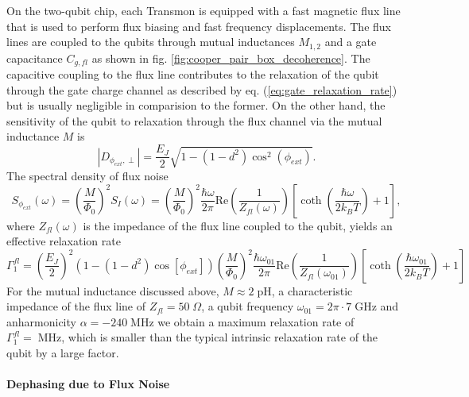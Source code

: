 On the two-qubit chip, each Transmon is equipped with a fast magnetic flux line that is used to perform flux biasing and fast frequency displacements. The flux lines are coupled to the qubits through mutual inductances $M_{1,2}$ and a gate capacitance $C_{g,fl}$ as shown in fig. \ref{fig:cooper_pair_box_decoherence}. The capacitive coupling to the flux line contributes to the relaxation of the qubit through the gate charge channel as described by eq. (\ref{eq:gate_relaxation_rate}) but is usually negligible in comparision to the former. On the other hand, the sensitivity of the qubit to relaxation through the flux channel via the mutual inductance $M$ is
%
\begin{equation}
\left|D_{\phi_{ext},\perp}\right|  = \frac{E_J}{2}\sqrt{1-(1-d^2)\cos^2{\left(\phi_{ext}\right)}}.
\end{equation}
%
The spectral density of flux noise
%
\begin{equation}
S_{\phi_{ext}}(\omega) = \left(\frac{M}{\Phi_0}\right)^2 S_I(\omega) = \left(\frac{M}{\Phi_0}\right)^2\frac{\hbar\omega}{2\pi}\mathrm{Re}\left(\frac{1}{Z_{fl}(\omega)}\right)\left[\coth{\left(\frac{\hbar\omega}{2k_B T}\right)}+1\right],
\end{equation}
%
where $Z_{fl}(\omega)$ is the impedance of the flux line coupled to the qubit, yields an effective relaxation rate
%
\begin{equation}
\Gamma_1^{fl}= \left(\frac{E_J}{2}\right)^2\left(1-(1-d^2)\cos{\left[\phi_{ext}\right]}\right)\left(\frac{M}{\Phi_0}\right)^2\frac{\hbar \omega_{01}}{2\pi}\mathrm{Re}\left(\frac{1}{Z_{fl}(\omega_{01})}\right)\left[\coth{\left(\frac{\hbar\omega_{01}}{2 k_B T}\right)}+1\right]
\end{equation}
%
For the mutual inductance discussed above, $M\approx 2\;\mathrm{pH}$, a characteristic impedance of the flux line of $Z_{fl}=50\;\Omega$, a qubit frequency $\omega_{01}=2\pi \cdot 7 \;\mathrm{GHz}$ and anharmonicity $\alpha=-240\;\mathrm{MHz}$ we obtain a maximum relaxation rate of $\Gamma_1^{fl}=\;\mathrm{MHz}$, which is smaller than the typical intrinsic relaxation rate of the qubit by a large factor.

\paragraph{Dephasing due to Flux Noise}

